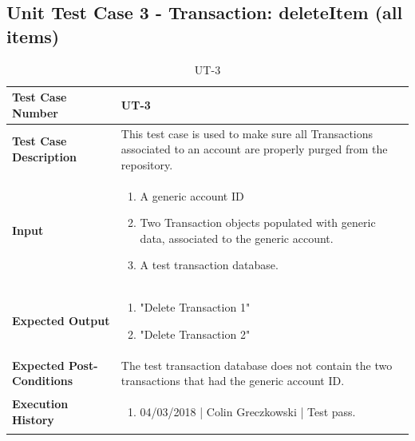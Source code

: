 \documentclass[12pt]{article}
\begin{document}
\subsection{Unit Test Case 3 - Transaction: deleteItem (all items)} 
\def\arraystretch{1.5}%
\begin{table}[htbp]
\centering
\caption {UT-3}
\label{UT-3}
\begin{tabularx}{\textwidth}{ | l | X |}
\hline
\textbf{Test Case Number}      &  UT-3                         \\ \hline
\textbf{Test Case Description}    &  This test case is used to make sure all Transactions associated to an account are properly purged from the repository.                \\ \hline
\textbf{Input}         & 	\begin{enumerate}
          \item A generic account ID
	\item Two Transaction objects populated with generic data, associated to the generic account.
	\item A test transaction database.
\end{enumerate} \\ \hline

\textbf{Expected Output}     & \begin{enumerate}
	\item "Delete Transaction 1"
           \item "Delete Transaction 2"
\end{enumerate} \\ \hline
\textbf{Expected Post-Conditions}           & The test transaction database does not contain the two transactions that had the generic account ID.                \\ \hline
\textbf{Execution History}   &  \begin{enumerate}
	\item 04/03/2018 | Colin Greczkowski | Test pass.
\end {enumerate} \\ \hline
\end{tabularx}
\end{table}
\clearpage

\end{document}
